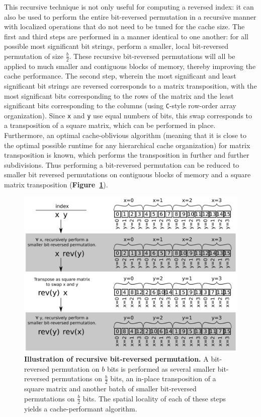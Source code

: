 \documentclass[10pt]{article}
\begin{document}
This recursive technique is not only useful for computing a reversed
index: it can also be used to perform the entire bit-reversed
permutation in a recursive manner with localized operations that do
not need to be tuned for the cache size. The first and third steps are
performed in a manner identical to one another: for all possible most
significant bit strings, perform a smaller, local bit-reversed
permutation of size $\frac{b}{2}$. These recursive bit-reversed
permutations will all be applied to much smaller and contiguous blocks
of memory, thereby improving the cache performance. The second step,
wherein the most significant and least significant bit strings are
reversed corresponds to a matrix transposition, with the most
significant bits corresponding to the rows of the matrix and the least
significant bits corresponding to the columns (using {\tt C}-style
row-order array organization). Since {\tt x} and {\tt y} use equal
numbers of bits, this swap corresponds to a transposition of a square
matrix, which can be performed in place. Furthermore, an optimal
cache-oblivious algorithm (meaning that it is close to the optimal
possible runtime for any hierarchical cache organization) for matrix
transposition is known, which performs the transposition in further
and further subdivisions\cite{prokop:cache}. Thus performing a
bit-reversed permutation can be reduced to smaller bit reversed
permutations on contiguous blocks of memory and a square matrix
transposition ({\bf Figure~\ref{figure:recursive}}).

\begin{figure}
\centering
\includegraphics[width=5in]{cartoons/recursive.pdf}
\caption{{\bf Illustration of recursive bit-reversed permutation.} A
  bit-reversed permutation on $b$ bits is performed as several smaller
  bit-reversed permutations on $\frac{b}{2}$ bits, an in-place
  transposition of a square matrix and another batch of smaller
  bit-reversed permutations on $\frac{b}{2}$ bits. The spatial
  locality of each of these steps yields a cache-performant algorithm.
  \label{figure:recursive}}
\end{figure}
\end{document}
